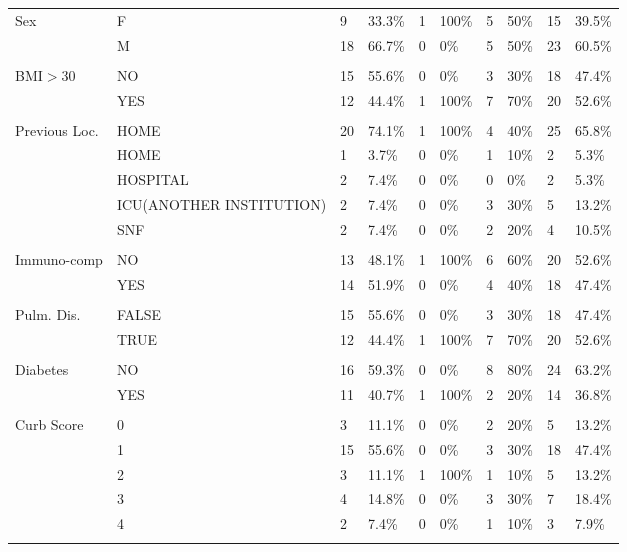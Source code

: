 \documentclass{article}\usepackage[]{graphicx}\usepackage[]{color}
\begin{document}
\begin{table}[ht]
\begin{tabular}{llllllllll}
  Sex & F & 9 & 33.3\% & 1 & 100\% & 5 & 50\% & 15 & 39.5\% \\ 
   & M & 18 & 66.7\% & 0 & 0\% & 5 & 50\% & 23 & 60.5\% \\ 
   &  &  &  &  &  &  &  &  &  \\ 
  BMI$>$30 & NO & 15 & 55.6\% & 0 & 0\% & 3 & 30\% & 18 & 47.4\% \\ 
   & YES & 12 & 44.4\% & 1 & 100\% & 7 & 70\% & 20 & 52.6\% \\ 
   &  &  &  &  &  &  &  &  &  \\ 
  Previous Loc. & HOME & 20 & 74.1\% & 1 & 100\% & 4 & 40\% & 25 & 65.8\% \\ 
   & HOME  & 1 & 3.7\% & 0 & 0\% & 1 & 10\% & 2 & 5.3\% \\ 
   & HOSPITAL & 2 & 7.4\% & 0 & 0\% & 0 & 0\% & 2 & 5.3\% \\ 
   & ICU(ANOTHER INSTITUTION) & 2 & 7.4\% & 0 & 0\% & 3 & 30\% & 5 & 13.2\% \\ 
   & SNF & 2 & 7.4\% & 0 & 0\% & 2 & 20\% & 4 & 10.5\% \\ 
   &  &  &  &  &  &  &  &  &  \\ 
  Immuno-comp & NO & 13 & 48.1\% & 1 & 100\% & 6 & 60\% & 20 & 52.6\% \\ 
   & YES & 14 & 51.9\% & 0 & 0\% & 4 & 40\% & 18 & 47.4\% \\ 
   &  &  &  &  &  &  &  &  &  \\ 
  Pulm. Dis. & FALSE & 15 & 55.6\% & 0 & 0\% & 3 & 30\% & 18 & 47.4\% \\ 
   & TRUE & 12 & 44.4\% & 1 & 100\% & 7 & 70\% & 20 & 52.6\% \\ 
   &  &  &  &  &  &  &  &  &  \\ 
  Diabetes & NO & 16 & 59.3\% & 0 & 0\% & 8 & 80\% & 24 & 63.2\% \\ 
   & YES & 11 & 40.7\% & 1 & 100\% & 2 & 20\% & 14 & 36.8\% \\ 
   &  &  &  &  &  &  &  &  &  \\ 
  Curb Score & 0 & 3 & 11.1\% & 0 & 0\% & 2 & 20\% & 5 & 13.2\% \\ 
   & 1 & 15 & 55.6\% & 0 & 0\% & 3 & 30\% & 18 & 47.4\% \\ 
   & 2 & 3 & 11.1\% & 1 & 100\% & 1 & 10\% & 5 & 13.2\% \\ 
   & 3 & 4 & 14.8\% & 0 & 0\% & 3 & 30\% & 7 & 18.4\% \\ 
   & 4 & 2 & 7.4\% & 0 & 0\% & 1 & 10\% & 3 & 7.9\% \\ 
   &  &  &  &  &  &  &  &  &  \\ 

\end{tabular}
\end{table}
\end{document}
